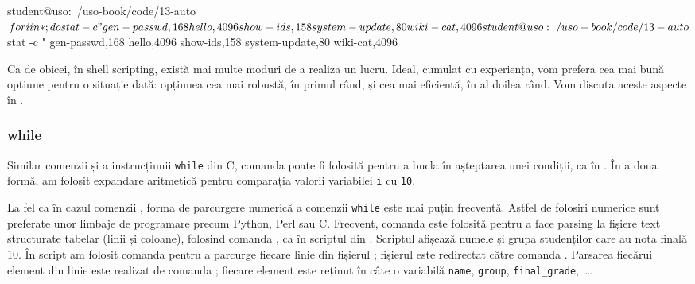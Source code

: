 \begin{screen}[caption={Alternativă la folosirea for},label={lst:auto:for-inefficient}]
student@uso:~/uso-book/code/13-auto$ for i in *; do stat -c "%
gen-passwd,168
hello,4096
show-ids,158
system-update,80
wiki-cat,4096

student@uso:~/uso-book/code/13-auto$ stat -c "%
gen-passwd,168
hello,4096
show-ids,158
system-update,80
wiki-cat,4096
\end{screen}

Ca de obicei, în shell scripting, există mai multe moduri de a realiza un lucru.
Ideal, cumulat cu experiența, vom prefera cea mai bună opțiune pentru o situație dată: opțiunea cea mai robustă, în primul rând, și cea mai eficientă, în al doilea rând.
Vom discuta aceste aspecte în .

\subsubsection{while}
\label{sec:auto:script-func:flow-control:while}

Similar comenzii  și a instrucțiunii \texttt{while} din C, comanda  poate fi folosită pentru a bucla în așteptarea unei condiții, ca în .
În a doua formă, am folosit expandare aritmetică pentru comparația valorii variabilei \texttt{i} cu \texttt{10}.


La fel ca în cazul comenzii , forma de parcurgere numerică a comenzii \texttt{while} este mai puțin frecventă.
Astfel de folosiri numerice sunt preferate unor limbaje de programare precum Python, Perl sau C.
Frecvent, comanda  este folosită pentru a face parsing la fișiere text structurate tabelar (linii și coloane), folosind comanda , ca în scriptul  din .
Scriptul afișează numele și grupa studenților care au nota finală 10.
În script am folosit comanda  pentru a parcurge fiecare linie din fișierul ; fișierul este redirectat către comanda .
Parsarea fiecărui element din linie este realizat de comanda ; fiecare element este reținut în câte o variabilă \texttt{name}, \texttt{group}, \texttt{final\_grade}, \ldots.

